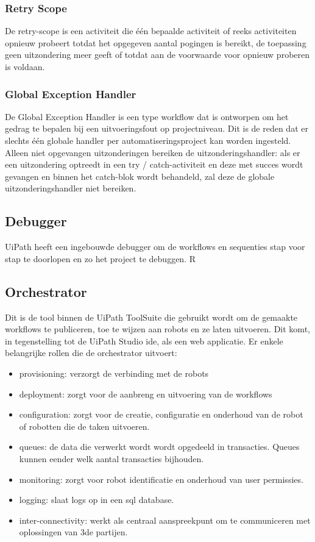 \subsubsection{Retry Scope}
De retry-scope is een activiteit die één bepaalde activiteit of reeks activiteiten opnieuw probeert totdat het opgegeven aantal pogingen is bereikt, de toepassing geen uitzondering meer geeft of totdat aan de voorwaarde voor opnieuw proberen is voldaan.

\subsubsection{Global Exception Handler}
De Global Exception Handler is een type workflow dat is ontworpen om het gedrag te bepalen bij een uitvoeringsfout op projectniveau. Dit is de reden dat er slechts één globale handler per automatiseringsproject kan worden ingesteld. Alleen niet opgevangen uitzonderingen bereiken de uitzonderingshandler: als er een uitzondering optreedt in een try / catch-activiteit en deze met succes wordt gevangen en binnen het catch-blok wordt behandeld, zal deze de globale uitzonderingshandler niet bereiken.

\subsection{Debugger}
UiPath heeft een ingebouwde debugger om de workflows en sequenties stap voor stap te doorlopen en zo het project te debuggen.
R
\subsection{Orchestrator}
Dit is de tool binnen de UiPath ToolSuite die gebruikt wordt om de gemaakte workflows te publiceren, toe te wijzen aan robots en ze laten uitvoeren. Dit komt, in tegenstelling tot de UiPath Studio ide, als een web applicatie. Er enkele belangrijke rollen die de orchestrator uitvoert:
\begin{itemize}
	\item provisioning: verzorgt de verbinding met de robots
	\item deployment: zorgt voor de aanbreng en uitvoering van de workflows
	\item configuration: zorgt voor de creatie, configuratie en onderhoud van de robot of robotten die de taken uitvoeren.
	\item queues: de data die verwerkt wordt wordt opgedeeld in transacties. Queues kunnen eender welk aantal transacties bijhouden.
	\item monitoring: zorgt voor robot identificatie en onderhoud van user permissies.
	\item logging: slaat logs op in een sql database.
	\item inter-connectivity: werkt als centraal aanspreekpunt om te communiceren met oplossingen van 3de partijen.
\end{itemize}

